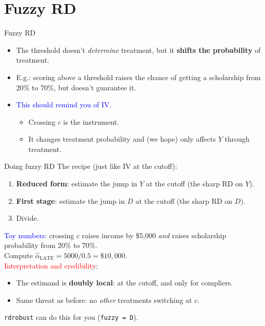 \documentclass[xcolor=dvipsnames]{beamer}
\begin{document}
\section{Fuzzy RD}

\begin{frame}{Fuzzy RD}
\small
\begin{itemize}
\item<1-> The threshold doesn't \textit{determine} treatment, but it \textbf{shifts the probability} of treatment.
\medskip
\item<2-> E.g.: scoring above a threshold raises the chance of getting a scholarship from 20\% to 70\%, but doesn't guarantee it.
\medskip
\item<3-> \textcolor{Blue}{This should remind you of IV.}
\smallskip
\begin{itemize}
\footnotesize
\item Crossing $c$ is the instrument.
\item It changes treatment probability and (we hope) only affects $Y$ through treatment.
\end{itemize}
\end{itemize}
\end{frame}


\begin{frame}{Doing fuzzy RD}
\small
{} The recipe (just like IV at the cutoff):
\begin{enumerate}
\footnotesize
  \item \textbf{Reduced form}: estimate the jump in $Y$ at the cutoff (the sharp RD on $Y$).
  \item \textbf{First stage}: estimate the jump in $D$ at the cutoff (the sharp RD on $D$).
  \item Divide.
\end{enumerate}
\medskip
{} \textcolor{Blue}{Toy numbers}: crossing $c$ raises income by \$5{,}000 \textit{and} raises scholarship probability from 20\% to 70\%. \\
\medskip
{} Compute $\hat{\alpha}_{\text{LATE}} = 5000 / 0.5 = \$10{,}000$.\\
\medskip
{} \textcolor{Red}{Interpretation and credibility}:
\begin{itemize}
\footnotesize
  \item The estimand is \textbf{doubly local}: at the cutoff, and only for compliers.
  \item Same threat as before: no \textit{other} treatments switching at $c$.
\end{itemize}
\medskip
{} \texttt{rdrobust} can do this for you (\texttt{fuzzy = D}).
\end{frame}
\end{document}
